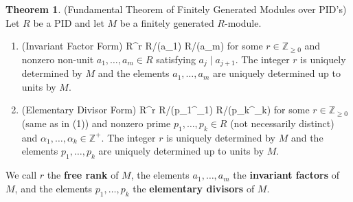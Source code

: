 \documentclass[12pt]{article}
\newcommand{\keyword}[1]{\textbf{#1}}
\def\[#1\]{\begin{align*}#1\end{align*}}
\theoremstyle{definition}
\newtheorem{theorem}{Theorem}
\newcommand{\Z}{\mathbb{Z}}
\newcommand{\<}{\left\langle}
\renewcommand{\>}{\right\rangle}
\newcommand{\isom}{\cong}
\newcommand{\dsum}{\oplus}
\newcommand{\divides}{\mid}
\begin{document}
\begin{theorem}(Fundamental Theorem of Finitely Generated Modules over PID's) Let $R$ be a PID and let $M$ be a finitely generated $R$-module.
    \begin{enumerate}[(1)]
        \item (Invariant Factor Form)
        \[
            M \isom R^r \dsum R/(a_1) \dsum \cdots \dsum R/(a_m)
        \]
        for some $r \in \Z_{\geq0}$ and nonzero non-unit $a_1, \dots, a_m \in R$ satisfying $a_j \divides a_{j+1}$. The integer $r$ is uniquely determined by $M$ and the elements $a_1, \dots, a_m$ are uniquely determined up to units by $M$.
        
        \item (Elementary Divisor Form)
        \[
            M \isom R^r \dsum R/(p_1^{\alpha_1}) \dsum \cdots \dsum R/(p_k^{\alpha_k})
        \]
        for some $r \in \Z_{\geq0}$ (same as in (1)) and nonzero prime $p_1, \dots, p_k \in R$ (not necessarily distinct) and $\alpha_1, \dots, \alpha_k \in \Z^+$. The integer $r$ is uniquely determined by $M$ and the elements $p_1, \dots, p_k$ are uniquely determined up to units by $M$.
    
        
    \end{enumerate}
    We call $r$ the \keyword{free rank} of $M$, the elements $a_1, \dots, a_m$ the \keyword{invariant factors} of $M$, and the elements $p_1, \dots, p_k$ the \keyword{elementary divisors} of $M$.
\end{theorem}
\end{document}
